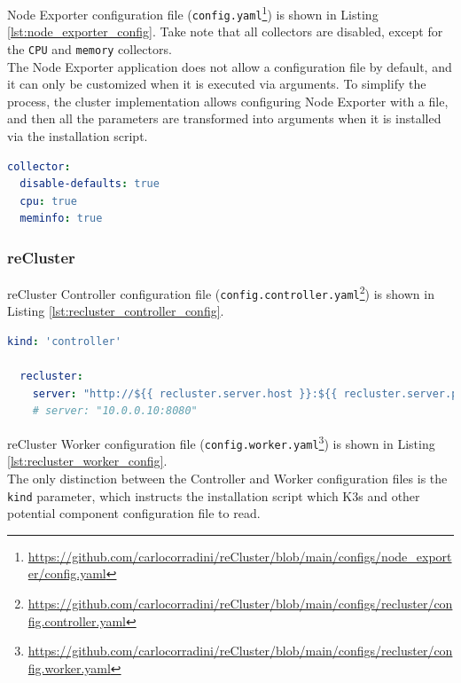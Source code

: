Node Exporter configuration file (\texttt{config.yaml}\footnote{\url{https://github.com/carlocorradini/reCluster/blob/main/configs/node_exporter/config.yaml}})
is shown in Listing \ref{lst:node_exporter_config}. Take note that all collectors
are disabled, except for the \texttt{CPU} and \texttt{memory} collectors. \\ %
The Node Exporter application does not allow a configuration file by default, and
it can only be customized when it is executed via arguments. To simplify the
process, the cluster implementation allows configuring Node Exporter with a file,
and then all the parameters are transformed into arguments when it is installed
via the installation script.

\begin{lstlisting}[language=yaml, alsoletter={.-}, morekeywords={[2]{collector, disable-defaults, cpu, meminfo}}, xleftmargin=\parindent, label={lst:node_exporter_config}, caption=Node Exporter configuration file]
collector:
  disable-defaults: true
  cpu: true
  meminfo: true
\end{lstlisting}

\subsubsection{reCluster}
\label{subsubsec:implementation_installer_configuration_files_recluster}

reCluster Controller configuration file (\texttt{config.controller.yaml}\footnote{\url{https://github.com/carlocorradini/reCluster/blob/main/configs/recluster/config.controller.yaml}})
is shown in Listing \ref{lst:recluster_controller_config}.

\begin{lstlisting}[language=yaml, alsoletter={.}, morekeywords={[2]{kind, recluster, server}}, xleftmargin=\parindent, label={lst:recluster_controller_config}, caption=reCluster Controller configuration file]
  kind: 'controller'

  recluster:
    server: "http://${{ recluster.server.host }}:${{ recluster.server.port }}"
    # server: "10.0.0.10:8080"
\end{lstlisting}

reCluster Worker configuration file (\texttt{config.worker.yaml}\footnote{\url{https://github.com/carlocorradini/reCluster/blob/main/configs/recluster/config.worker.yaml}})
is shown in Listing \ref{lst:recluster_worker_config}. \\ %
The only distinction between the Controller and Worker configuration files is the
\texttt{kind} parameter, which instructs the installation script which K3s and other
potential component configuration file to read.

